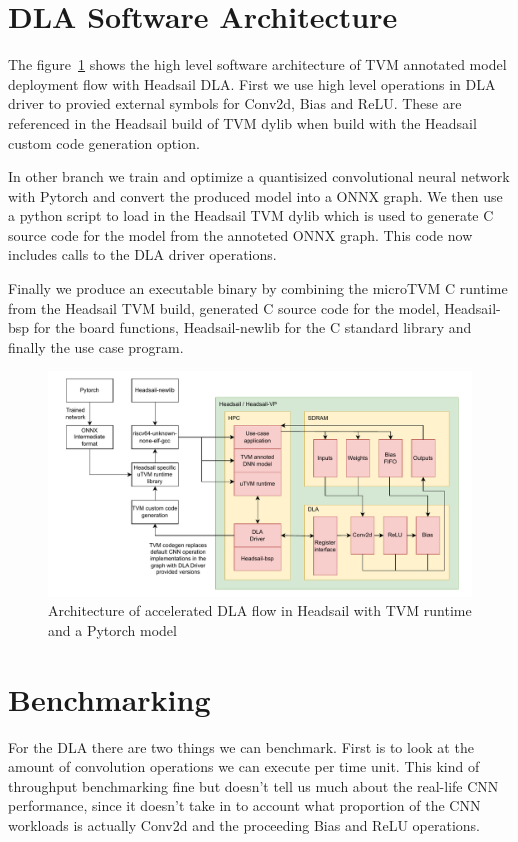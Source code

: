 \documentclass[12pt,a4paper,english
]{tunithesis}
\begin{document}
\section{DLA Software Architecture}
The figure~\ref{fig:architecture} shows the high level software architecture of TVM annotated model deployment flow with Headsail DLA. First we use high level operations in DLA driver to provied external symbols for Conv2d, Bias and ReLU. These are referenced in the Headsail build of TVM dylib when build with the Headsail custom code generation option.

In other branch we train and optimize a quantisized convolutional neural network with Pytorch and convert the produced model into a ONNX graph.
We then use a python script to load in the Headsail TVM dylib which is used to generate C source code for the model from the annoteted ONNX graph. This code now includes calls to the DLA driver operations.

Finally we produce an executable binary by combining the microTVM C runtime from the Headsail TVM build, generated C source code for the model, Headsail-bsp for the board functions, Headsail-newlib for the C standard library and finally the use case program.

\begin{figure}
  \centering
  \includegraphics[width=\textwidth]{img/dla-architecture.pdf}
  \caption{Architecture of accelerated DLA flow in Headsail with TVM runtime and a Pytorch model}
  \label{fig:architecture}
\end{figure}


\section{Benchmarking}
For the DLA there are two things we can benchmark. First is to look at the amount of convolution operations we can execute per time unit. This kind of throughput benchmarking fine but doesn't tell us much about the real-life CNN performance, since it doesn't take in to account what proportion of the CNN workloads is actually Conv2d and the proceeding Bias and ReLU operations.
\end{document}

